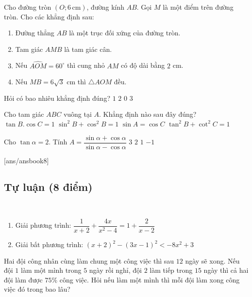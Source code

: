 \begin{ex}
Cho đường tròn $(O;6\,\text{cm})$, đường kính $AB$. Gọi $M$ là một điểm trên đường tròn. Cho các khẳng định sau:
\begin{enumerate}[label=\roman*)]
\item Đường thẳng $AB$ là một trục đối xứng của đường tròn.
\item Tam giác $AMB$ là tam giác cân.
\item Nếu $\widehat{AOM}=60^\circ$ thì cung nhỏ $AM$ có độ dài bằng $2$ cm.
\item Nếu $MB=6\sqrt{3}$ cm thì $\triangle AOM$ đều.
\end{enumerate}
Hỏi có bao nhiêu khẳng định đúng?
\choice
{$1$}
{\True $2$}
{$0$}
{$3$}
\end{ex}

\begin{ex}
Cho tam giác $ABC$ vuông tại $A$. Khẳng định nào sau đây đúng?
\choice
{$\tan B. \cos C=1$}
{\True $\sin^2 B + \cos^2 B=1$}
{$\sin A=\cos C$}
{$\tan^2 B+ \cot^2 C=1$}
\end{ex}

\begin{ex}
Cho $\tan \alpha=2$. Tính $A=\dfrac{\sin \alpha +\cos \alpha}{\sin \alpha -\cos \alpha}$
\choice
{\True $3$}
{$2$}
{$1$}
{$-1$}
\end{ex}


[ans/ansbook8]
\setcounter{bt}{0}
\subsection{Tự luận (8 điểm)}

\begin{bt}[1,5 điểm] $    $
\begin{enumerate}
\item Giải phương trình: $\dfrac{1}{x+2}+\dfrac{4x}{x^2-4}=1+\dfrac{2}{x-2}$
\item Giải bất phương trình: $(x+2)^2-(3x-1)^2<-8x^2+3$
\end{enumerate}
\end{bt}

\begin{bt}[1 điểm]
Hai đội công nhân cùng làm chung một công việc thì sau $12$ ngày sẽ xong. Nếu đội $1$ làm một mình trong $5$ ngày rồi nghỉ, đội $2$ làm tiếp trong $15$ ngày thì cả hai đội làm được $75\%$ công việc. Hỏi nếu làm một mình thì mỗi đội làm xong công việc đó trong bao lâu? 
\end{bt}

